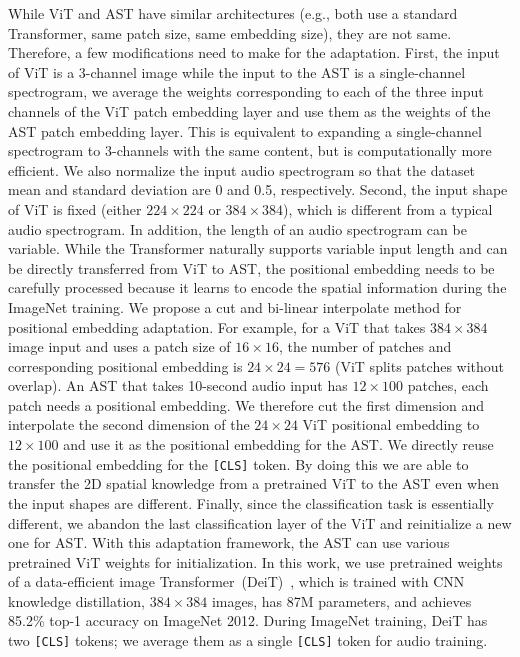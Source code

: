 \documentclass[a4paper]{article}
\begin{document}
While ViT and AST have similar architectures (e.g., both use a standard Transformer, same patch size, same embedding size), they are not same. Therefore, a few modifications need to make for the adaptation. First, the input of ViT is a 3-channel image while the input to the AST is a single-channel spectrogram, we average the weights corresponding to each of the three input channels of the ViT patch embedding layer and use them as the weights of the AST patch embedding layer. This is equivalent to expanding a single-channel spectrogram to 3-channels with the same content, but is computationally more efficient. We also normalize the input audio spectrogram so that the dataset mean and standard deviation are 0 and 0.5, respectively. Second, the input shape of ViT is fixed (either $224\times224$ or $384\times384$), which is different from a typical audio spectrogram. In addition, the length of an audio spectrogram can be variable. While the Transformer naturally supports variable input length and can be directly transferred from ViT to AST, the positional embedding needs to be carefully processed because it learns to encode the spatial information during the ImageNet training. We propose a cut and bi-linear interpolate method for positional embedding adaptation. For example, for a ViT that takes $384\times384$ image input and uses a patch size of $16\times16$, the number of patches and corresponding positional embedding is $24\times24=576$ (ViT splits patches without overlap). An AST that takes 10-second audio input has $12\times100$ patches, each patch needs a positional embedding. We therefore cut the first dimension and interpolate the second dimension of the $24\times24$ ViT positional embedding to $12\times100$ and use it as the positional embedding for the AST. We directly reuse the positional embedding for the \texttt{[CLS]} token. By doing this we are able to transfer the 2D spatial knowledge from a pretrained ViT to the AST even when the input shapes are different. Finally, since the classification task is essentially different, we abandon the last classification layer of the ViT and reinitialize a new one for AST. With this adaptation framework, the AST can use various pretrained ViT weights for initialization. In this work, we use pretrained weights of a data-efficient image Transformer~(DeiT)~\cite{touvron2020deit}, which is trained with CNN knowledge distillation, $384\times384$ images, has 87M parameters, and achieves 85.2\% top-1 accuracy on ImageNet 2012. During ImageNet training, DeiT has two \texttt{[CLS]} tokens; we average them as a single \texttt{[CLS]} token for audio training.
\end{document}
